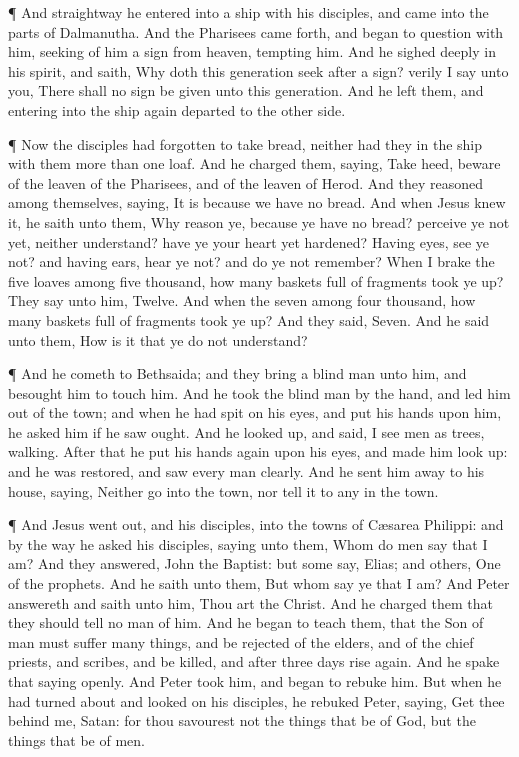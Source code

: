  ¶ And straightway he entered into a ship with his
disciples, and came into the parts of Dalmanutha.  And the
Pharisees came forth, and began to question with him, seeking of him a
sign from heaven, tempting him.  And he sighed deeply in
his spirit, and saith, Why doth this generation seek after a sign?
verily I say unto you, There shall no sign be given unto this
generation.  And he left them, and entering into the ship
again departed to the other side.

 ¶ Now the disciples had forgotten to take bread, neither
had they in the ship with them more than one loaf.  And he
charged them, saying, Take heed, beware of the leaven of the Pharisees,
and of the leaven of Herod.  And they reasoned among
themselves, saying, It is because we have no bread.  And
when Jesus knew it, he saith unto them, Why reason ye, because ye have
no bread? perceive ye not yet, neither understand? have ye your heart
yet hardened?  Having eyes, see ye not? and having ears,
hear ye not? and do ye not remember?  When I brake the five
loaves among five thousand, how many baskets full of fragments took ye
up? They say unto him, Twelve.  And when the seven among
four thousand, how many baskets full of fragments took ye up? And they
said, Seven.  And he said unto them, How is it that ye do
not understand?

 ¶ And he cometh to Bethsaida; and they bring a blind man
unto him, and besought him to touch him.  And he took the
blind man by the hand, and led him out of the town; and when he had spit
on his eyes, and put his hands upon him, he asked him if he saw ought.
 And he looked up, and said, I see men as trees, walking.
 After that he put his hands again upon his eyes, and made
him look up: and he was restored, and saw every man clearly.
 And he sent him away to his house, saying, Neither go into
the town, nor tell it to any in the town.

 ¶ And Jesus went out, and his disciples, into the towns of
Cæsarea Philippi: and by the way he asked his disciples, saying unto
them, Whom do men say that I am?  And they answered, John
the Baptist: but some say, Elias; and others, One of the prophets.
 And he saith unto them, But whom say ye that I am? And
Peter answereth and saith unto him, Thou art the Christ. 
And he charged them that they should tell no man of him. 
And he began to teach them, that the Son of man must suffer many things,
and be rejected of the elders, and of the chief priests, and scribes,
and be killed, and after three days rise again.  And he
spake that saying openly. And Peter took him, and began to rebuke him.
 But when he had turned about and looked on his disciples,
he rebuked Peter, saying, Get thee behind me, Satan: for thou savourest
not the things that be of God, but the things that be of men.

